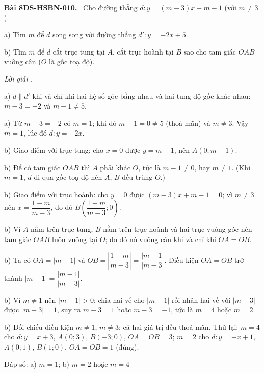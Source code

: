 \documentclass[12pt,a4paper]{article}
\newenvironment{problem}[1][]{\par\medskip\noindent\textbf{Bài #1.}\ }{\par}
\newenvironment{solution}[1][]{\par\noindent\textit{Lời giải #1.}\par}{\par}
\begin{document}
\begin{problem}[8DS-HSBN-010]
Cho đường thẳng $d: y = (m - 3)x + m - 1$ (với $m \neq 3$).

a) Tìm $m$ để $d$ song song với đường thẳng $d': y = -2x + 5$.

b) Tìm $m$ để $d$ cắt trục tung tại $A$, cắt trục hoành tại $B$ sao cho tam giác $OAB$ vuông cân ($O$ là gốc toạ độ).

\begin{solution}
a) $d \parallel d'$ khi và chỉ khi hai hệ số góc bằng nhau và hai tung độ gốc khác nhau: $m - 3 = -2$ và $m - 1 \neq 5$.

a) Từ $m - 3 = -2$ có $m = 1$; khi đó $m - 1 = 0 \neq 5$ (thoả mãn) và $m \neq 3$. Vậy $m = 1$, lúc đó $d: y = -2x$.

b) Giao điểm với trục tung: cho $x = 0$ được $y = m - 1$, nên $A(0; m - 1)$.

b) Để có tam giác $OAB$ thì $A$ phải khác $O$, tức là $m - 1 \neq 0$, hay $m \neq 1$. (Khi $m = 1$, $d$ đi qua gốc toạ độ nên $A$, $B$ đều trùng $O$.)

b) Giao điểm với trục hoành: cho $y = 0$ được $(m - 3)x + m - 1 = 0$; vì $m \neq 3$ nên $x = \dfrac{1 - m}{m - 3}$, do đó $B\left(\dfrac{1 - m}{m - 3}; 0\right)$.

b) Vì $A$ nằm trên trục tung, $B$ nằm trên trục hoành và hai trục vuông góc nên tam giác $OAB$ luôn vuông tại $O$; do đó nó vuông cân khi và chỉ khi $OA = OB$.

b) Ta có $OA = |m - 1|$ và $OB = \left|\dfrac{1 - m}{m - 3}\right| = \dfrac{|m - 1|}{|m - 3|}$. Điều kiện $OA = OB$ trở thành $|m - 1| = \dfrac{|m - 1|}{|m - 3|}$.

b) Vì $m \neq 1$ nên $|m - 1| > 0$; chia hai vế cho $|m - 1|$ rồi nhân hai vế với $|m - 3|$ được $|m - 3| = 1$, suy ra $m - 3 = 1$ hoặc $m - 3 = -1$, tức là $m = 4$ hoặc $m = 2$.

b) Đối chiếu điều kiện $m \neq 1$, $m \neq 3$: cả hai giá trị đều thoả mãn. Thử lại: $m = 4$ cho $d: y = x + 3$, $A(0; 3)$, $B(-3; 0)$, $OA = OB = 3$; $m = 2$ cho $d: y = -x + 1$, $A(0; 1)$, $B(1; 0)$, $OA = OB = 1$ (đúng).

Đáp số: a) $\boxed{m = 1}$; b) $\boxed{m = 2 \text{ hoặc } m = 4}$
\end{solution}
\end{problem}
\end{document}
